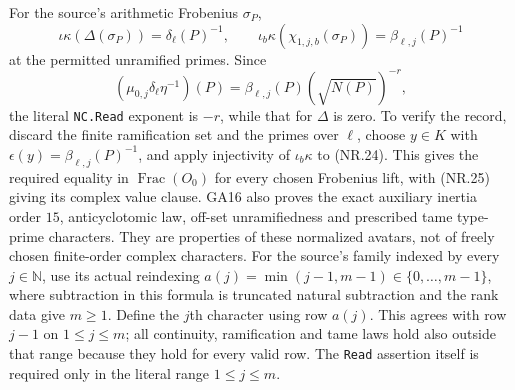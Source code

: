 For the source's arithmetic Frobenius $\sigma_P$,
\[
 \iota\kappa(\Delta(\sigma_P))=\delta_\ell(P)^{-1},
 \qquad
 \iota_b\kappa(\chi_{1,j,b}(\sigma_P))
                                   =\beta_{\ell,j}(P)^{-1}
                                                               \tag{NR.24}
\]
at the permitted unramified primes. Since
\[
 (\mu_{0,j}\delta_\ell\eta^{-1})(P)
       =\beta_{\ell,j}(P)(\sqrt{N(P)})^{-r},            \tag{NR.25}
\]
the literal \texttt{NC.Read} exponent is $-r$, while that for
$\Delta$ is zero. To verify the record, discard the finite
ramification set and the primes over $\ell$, choose
$y\in K$ with $\epsilon(y)=\beta_{\ell,j}(P)^{-1}$, and apply
injectivity of $\iota_b\kappa$ to (NR.24). This gives the required
equality in $\operatorname{Frac}(O_0)$ for every chosen Frobenius
lift, with (NR.25) giving its complex value clause.
GA16 also proves the exact auxiliary inertia order $15$,
anticyclotomic law, off-set unramifiedness and prescribed tame
type-prime characters. They are properties of these normalized
avatars, not of freely chosen finite-order complex characters.
For the source's family indexed by every $j\in\mathbb N$, use
its actual reindexing $a(j)=\min(j-1,m-1)\in\{0,\ldots,m-1\}$,
where subtraction in this formula is truncated natural
subtraction and the rank data give $m\ge1$. Define the $j$th
character using row $a(j)$. This agrees with row $j-1$ on
$1\le j\le m$; all continuity, ramification and tame laws hold
also outside that range because they hold for every valid row.
The \texttt{Read} assertion itself is required only in the
literal range $1\le j\le m$.

